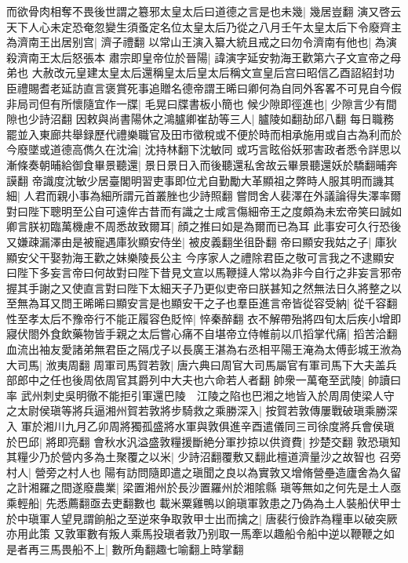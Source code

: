 而欲骨肉相奪不畏後世謂之簒邪太皇太后曰道德之言是也未幾|{
	幾居豈翻}
演又啓云天下人心未定恐奄忽變生須蚤定名位太皇太后乃從之八月壬午太皇太后下令廢齊主為濟南王出居别宫|{
	濟子禮翻}
以常山王演入纂大統且戒之曰勿令濟南有他也|{
	為演殺濟南王太后怒張本}
肅宗即皇帝位於晉陽|{
	諱演字延安勃海王歡第六子文宣帝之母弟也}
大赦改元皇建太皇太后還稱皇太后皇太后稱文宣皇后宫曰昭信乙酉詔紹封功臣禮賜耆老延訪直言褒賞死事追贈名德帝謂王晞曰卿何為自同外客畧不可見自今假非局司但有所懷隨宜作一牒|{
	毛晃曰牒書板小簡也}
候少隙即徑進也|{
	少隙言少有間隙也少詩沼翻}
因敕與尚書陽休之鴻臚卿崔劼等三人|{
	臚陵如翻劼邱八翻}
每日職務罷並入東廊共舉録歷代禮樂職官及田市徵稅或不便於時而相承施用或自古為利而於今廢墜或道德高儁久在沈淪|{
	沈持林翻下沈敏同}
或巧言眩俗妖邪害政者悉令詳思以漸條奏朝晡給御食畢景聽還|{
	景日景日入而後聽還私舍故云畢景聽還妖於驕翻晡奔謨翻}
帝識度沈敏少居臺閣明習吏事即位尤自勤勵大革顯祖之弊時人服其明而譏其細|{
	人君而親小事為細所謂元首叢脞也少詩照翻}
嘗問舍人裴澤在外議論得失澤率爾對曰陛下聰明至公自可遠侔古昔而有識之士咸言傷細帝王之度頗為未宏帝笑曰誠如卿言朕初臨萬機慮不周悉故致爾耳|{
	顔之推曰如是為爾而已為耳}
此事安可久行恐後又嫌疎漏澤由是被寵遇庫狄顯安侍坐|{
	被皮義翻坐徂卧翻}
帝曰顯安我姑之子|{
	庫狄顯安父干娶勃海王歡之妹樂陵長公主}
今序家人之禮除君臣之敬可言我之不逮顯安曰陛下多妄言帝曰何故對曰陛下昔見文宣以馬鞭撻人常以為非今自行之非妄言邪帝握其手謝之又使直言對曰陛下太細天子乃更似吏帝曰朕甚知之然無法日久將整之以至無為耳又問王晞晞曰顯安言是也顯安干之子也羣臣進言帝皆從容受納|{
	從千容翻}
性至孝太后不豫帝行不能正履容色貶悴|{
	悴秦醉翻}
衣不解帶殆將四旬太后疾小增即寢伏閤外食飲藥物皆手親之太后嘗心痛不自堪帝立侍帷前以爪搯掌代痛|{
	搯苦洽翻}
血流出袖友愛諸弟無君臣之隔戊子以長廣王湛為右丞相平陽王淹為太傅彭城王浟為大司馬|{
	浟夷周翻}
周軍司馬賀若敦|{
	唐六典曰周官大司馬屬官有軍司馬下大夫盖兵部郎中之任也後周依周官其爵列中大夫也六命若人者翻}
帥衆一萬奄至武陵|{
	帥讀曰率}
武州刺史吳明徹不能拒引軍還巴陵　江陵之陷也巴湘之地皆入於周周使梁人守之太尉侯瑱等將兵逼湘州賀若敦將步騎救之乘勝深入|{
	按賀若敦傳屢戰破瑱乘勝深入}
軍於湘川九月乙卯周將獨孤盛將水軍與敦俱進辛酉遣儀同三司徐度將兵會侯瑱於巴邱|{
	將即亮翻}
會秋水汎溢盛敦糧援斷絶分軍抄掠以供資費|{
	抄楚交翻}
敦恐瑱知其糧少乃於營内多為土聚覆之以米|{
	少詩沼翻覆敷又翻此檀道濟量沙之故智也}
召旁村人|{
	營旁之村人也}
陽有訪問隨即遣之瑱聞之良以為實敦又增脩營壘造廬舍為久留之計湘羅之間遂廢農業|{
	梁置湘州於長沙置羅州於湘隂縣}
瑱等無如之何先是土人亟乘輕船|{
	先悉薦翻亟去吏翻數也}
載米粟雞鴨以餉瑱軍敦患之乃偽為土人裝船伏甲士於中瑱軍人望見謂餉船之至逆來争取敦甲士出而擒之|{
	唐裴行儉詐為糧車以破突厥亦用此策}
又敦軍數有叛人乘馬投瑱者敦乃别取一馬牽以趣船令船中逆以鞭鞭之如是者再三馬畏船不上|{
	數所角翻趣七喻翻上時掌翻}
